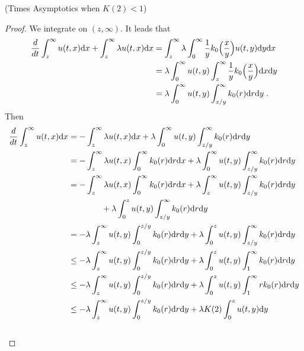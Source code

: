 \documentclass[11pt]{amsart}
\begin{document}
\begin{theorem}(Times Asymptotics when $K(2) < 1$) \\
\end{theorem}

\begin{proof}
We integrate on $(z, \infty)$. It leads that
    \begin{align*}
        \frac{d}{d t} \int_z^\infty u(t,x) \mathrm dx
        +
        \int_z^\infty \lambda u(t,x) \mathrm dx
        &=
        \int_z^\infty \lambda \int_{0}^{\infty} \frac{1}{y} k_0 \Big(\frac{x}{y} \Big) u(t,y) \mathrm dy \mathrm dx \\
	       &= 
	       \lambda \int_0^\infty  u(t,y) \int_{z}^{\infty} \frac{1}{y} k_0 \Big(\frac{x}{y} \Big)\mathrm dx \mathrm dy 	   \\
	       &= 
	       \lambda \int_0^\infty  u(t,y)  \int_{z/y}^{\infty} k_0(r) \mathrm dr \mathrm dy
	       \; .
    \end{align*}
Then 
    \begin{align*}
        \frac{d}{d t} \int_z^\infty u(t,x) \mathrm dx
        &= - \int_z^\infty \lambda u(t,x) \mathrm dx +  \lambda \int_0^\infty  u(t,y) \int_{z/y}^{\infty} k_0(r) \mathrm dr \mathrm dy \\
        &=  - \int_z^\infty \lambda u(t,x) \int_{0}^{\infty} k_0(r) \mathrm dr \mathrm dx +  \lambda \int_0^\infty  u(t,y) \int_{z/y}^{\infty} k_0(r) \mathrm dr \mathrm dy \\
        &= - \int_z^\infty \lambda u(t,x) \int_{0}^{\infty} k_0(r) \mathrm dr \mathrm dx +  \lambda \int_z^\infty  u(t,y)  \int_{z/y}^{\infty} k_0(r) \mathrm dr \mathrm dy \\
            &\qquad\qquad +  \lambda \int_0^z  u(t,y)  \int_{z/y}^{\infty} k_0(r) \mathrm dr \mathrm dy \\
        &= -  \lambda \int_z^\infty  u(t,y) \int_{0}^{z/y} k_0(r) \mathrm dr \mathrm dy  +  \lambda \int_0^z  u(t,y)  \int_{z/y}^{\infty} k_0(r) \mathrm dr \mathrm dy \\
        &\leq -  \lambda \int_z^\infty  u(t,y) \int_{0}^{z/y} k_0(r) \mathrm dr \mathrm dy  +  \lambda \int_0^z  u(t,y)  \int_{1}^{\infty} k_0(r) \mathrm dr \mathrm dy \\
        &\leq -  \lambda \int_z^\infty  u(t,y) \int_{0}^{z/y} k_0(r) \mathrm dr \mathrm dy  +  \lambda \int_0^z  u(t,y)  \int_{1}^{\infty} r k_0(r) \mathrm dr \mathrm dy \\ 
        &\leq -  \lambda \int_z^\infty  u(t,y) \int_{0}^{z/y} k_0(r) \mathrm dr \mathrm dy  +  \lambda K(2) \int_0^z  u(t,y) \mathrm dy \\
    \end{align*}
\\
\end{proof}
\end{document}
